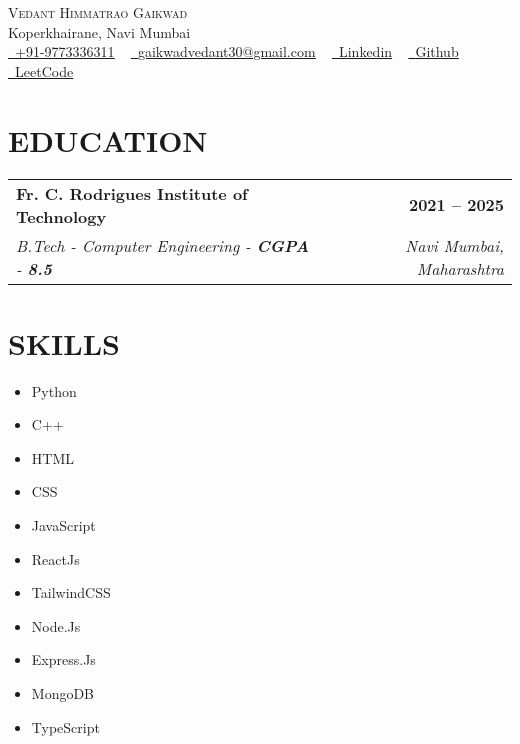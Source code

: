 \documentclass[letterpaper,11pt]{article}
\makeatletter
\newcommand{\resumeSubheading}[4]{
  \vspace{-2pt}\item
    \begin{tabular*}{1.0\textwidth}[t]{l@{\extracolsep{\fill}}r}
      \textbf{\large#1} & \textbf{\small #2} \\
      \textit{\large#3} & \textit{\small #4} \\
      
    \end{tabular*}\vspace{-7pt}
}
\makeatother
\begin{document}

\begin{center}
    {\Huge \scshape Vedant Himmatrao Gaikwad} \\ \vspace{1pt}
    Koperkhairane, Navi Mumbai  \\ \vspace{1pt}
    \small \href{tel:+919773336311}{\raisebox{-0.1\height}\faPhone\ \underline{+91-9773336311}} ~ 
    \href{mailto:gaikwadvedant30@gmail.com}{\raisebox{-0.2\height}\faEnvelope\ \underline{gaikwadvedant30@gmail.com}} ~ 
    \href{http://www.linkedin.com/in/vedant-gaikwad-b2516b226}{\raisebox{-0.2\height}\faLinkedinSquare\ \underline{Linkedin}}  ~
    \href{https://github.com/ghOst-vedant}{\raisebox{-0.2\height}\faGithub\ \underline{Github}} ~
    \href{https://leetcode.com/u/ghOst-vedant/}{\ \underline{LeetCode}} ~
\end{center}
\vspace{0.5mm}

\vspace{6pt}
\section{EDUCATION}
  \resumeSubheading
    {Fr. C. Rodrigues Institute of Technology}{2021 – 2025}
    {B.Tech - Computer Engineering - \textbf{CGPA} - \textbf{8.5}}{Navi Mumbai, Maharashtra}
\vspace{6pt}
\vspace{6pt}
\section{SKILLS}
    \begin{multicols}{6}
        \begin{itemize}[itemsep=-2pt, parsep=5pt]
            \item Python
            \item C++
            \item HTML
            \item CSS
            \item JavaScript
            \item ReactJs
            \item TailwindCSS
            \item Node.Js
            \item Express.Js
            \item MongoDB
            \item TypeScript
        \end{itemize}
    \end{multicols}
    \vspace*{2.0\multicolsep}
\end{document}
